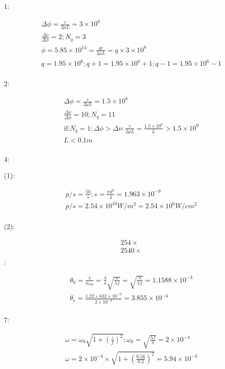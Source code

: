 \documentclass{article}
\begin{document}
1:

\begin{align*}
&\Delta \phi=\frac{c}{2\mu L}=3 \times  10^8\\
&\frac{\Delta\nu}{\Delta\phi}=2;N_q=3\\
&\phi=5.85 \times 10^{14}=\frac{qc}{2\mu L}=q \times 3 \times 10^8\\
&q=1.95 \times 10^6;q+1=1.95 \times 10^6+1;q-1=1.95 \times 10^6-1\\
\end{align*}

2:

\begin{align*}
&\Delta\phi=\frac{c}{2\mu L}=1.5 \times 10^8\\
&\frac{\Delta\nu}{\Delta\phi}=10;N_q=11\\
&\text{if:}N_q=1;\Delta\phi>\Delta\nu:\frac{c}{2\mu L}=\frac{1.5 \times 10^8}{L}>1.5 \times 10^9\\
&L<0.1m\\
\end{align*}

4:

(1):

\begin{align*}
&p/s=\frac{50}{s};s=\frac{\pi d^2}4=1.963 \times 10^{-9}\\
&p/s=2.54 \times 10^{10}W/m^2=2.54 \times 10^6 W/cm^2\\
\end{align*}

(2):

\begin{align*}
&254 \times \\
&2540 \times \\
\end{align*}
:

\begin{align*}
&\theta_0=\frac{\lambda}{\pi\omega_0}=\frac{\lambda}\pi\sqrt{\frac{\pi}{\lambda f}}=\sqrt{\frac{\lambda}{\pi f}}=1.1588 \times 10^{-3}\\
&\theta_r=\frac{1.22 \times 632 \times 10^{-9}}{2 \times 10^{-3}}=3.855 \times 10^{-4}\\
\end{align*}

7:

\begin{align*}
&\omega=\omega_0\sqrt{1+(\frac zf)^2};\omega_0=\sqrt{\frac{\lambda f}\pi}=2 \times 10^{-4}\\
&\omega=2 \times 10^{-4} \times \sqrt{1+(\frac{0.56}{0.2})^2}=5.94 \times 10^{-4}\\
\end{align*}
\end{document}
